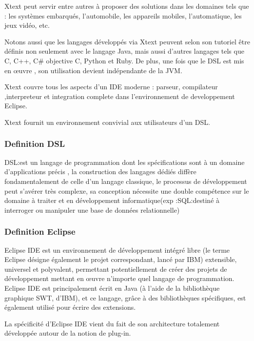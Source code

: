 \documentclass{article}
\begin{document}
Xtext peut servir entre autres à proposer des solutions dans les domaines tels que : les systèmes embarqués, l'automobile, les appareils mobiles, l'automatique, les jeux vidéo, etc.

Notons aussi que les langages développés via Xtext peuvent selon son tutoriel être définis non seulement avec le langage Java, mais aussi d'autres langages tels que C, C++, C\# objective C, Python et Ruby. De plus, une fois que le DSL est mis en œuvre , son utilisation devient indépendante de la JVM. 

Xtext couvre tous les aspects d’un IDE moderne : parseur, compilateur ,interpreteur et integration complete dans l’environnement de developpement Eclipse.

Xtext fournit un environnement convivial aux utilisateurs d’un DSL.

\subsubsection{Definition DSL}
DSL:est un langage de programmation dont les spécifications sont à un domaine d’applications précis , la construction des langages dédiés diffère fondamentalement de celle d’un langage classique, le processus de développement  peut s'avérer très complexe, sa conception nécessite une double compétence sur le domaine à traiter et en développement informatique(exp :SQL:destiné à interroger ou manipuler une base de données relationnelle)

\subsubsection{Definition Eclipse}
Eclipse IDE est un environnement de développement intégré libre (le terme Eclipse désigne également le projet correspondant, lancé par IBM) extensible, universel et polyvalent, permettant potentiellement de créer des projets de développement mettant en œuvre n'importe quel langage de programmation. Eclipse IDE est principalement écrit en Java (à l'aide de la bibliothèque graphique SWT, d'IBM), et ce langage, grâce à des bibliothèques spécifiques, est également utilisé pour écrire des extensions.

La spécificité d'Eclipse IDE vient du fait de son architecture totalement développée autour de la notion de plug-in.
\end{document}
